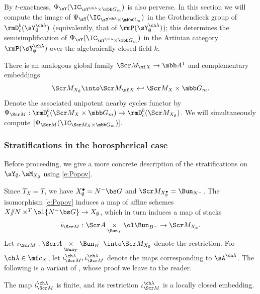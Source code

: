 By $t$-exactness, $\Psi_\sY(\IC_{\sY^{\ch\lambda}\times \mbb G_m})$ is also perverse.
In this section we will compute the image
of $\Psi_\sY(\IC_{\sY^{\ch\lambda} \times \mbb G_m})$ in the Grothendieck group
of $\rmD^b_c(\sY^{\ch\lambda}_\emptyset)$ (equivalently, that of $\rmP(\sY^{\ch\lambda}_\emptyset)$);
this determines the semisimplification of $\Psi_\sY(\IC_{\sY^{\ch\lambda} \times \mbb G_m})$
in the Artinian category $\rmP(\sY^{\ch\lambda}_\emptyset)$
over the algebraically closed field $k$.



There is an analogous global family $\Scr M_{\mf X} \to \mbb A^1$
and complementary embeddings
\[ \Scr M_{X_\emptyset} \into \Scr M_{\mf X} \hookleftarrow \Scr M_X \times \mbb G_m.  \]
Denote the associated unipotent nearby cycles functor by
$\Psi_{\Scr M} : \rmD^b_c(\Scr M_X\times \mbb G_m) \to \rmD^b_c(\Scr M_{X_\emptyset})$.
We will simultaneously compute
$[\Psi_{\Scr M}(\IC_{\Scr M_X\times \mbb G_m})]$.

\subsubsection{Stratifications in the horospherical case} \label{sect:horo-strat}
Before proceeding, we give a more concrete description of the stratifications
on $\sY_\emptyset, \sM_{X_\emptyset}$ using \eqref{e:Popov}.

Since $T_X=T$, we have $X_\emptyset^\bullet = N^-\bs G$ and
$\Scr M_{X_\emptyset^\bullet} = \Bun_{N^-}$.
The isomorphism \eqref{e:Popov} induces a map of affine schemes
$X/\!\!/N \times^T \ol{N^-\bs G} \to X_\emptyset$, which in turn induces
a map of stacks
\[ \bar\iota_{\Scr M} : \Scr A \underset{\Bun_T} \times \ol\Bun_{B^-} \to \Scr M_{X_\emptyset}. \]
Let $\iota_{\Scr M} : \Scr A \underset{\Bun_T}\times \Bun_{B^-} \into \Scr M_{X_\emptyset}$
denote the restriction.
For $\ch\lambda \in \mf c_X$, let $\iota^{\ch\lambda}_{\Scr M}, \bar\iota^{\ch\lambda}_{\Scr M}$
denote the maps corresponding to $\sA^{\ch\lambda}$.
The following is a variant of \cite[Proposition 1.2.7]{BG}, whose proof we leave to the reader.
\begin{prop}
\notready
The map $\bar\iota_{\Scr M}^{\ch\lambda}$ is finite, and its restriction $\iota_{\Scr M}^{\ch\lambda}$ is
a locally closed embedding.
\end{prop}

